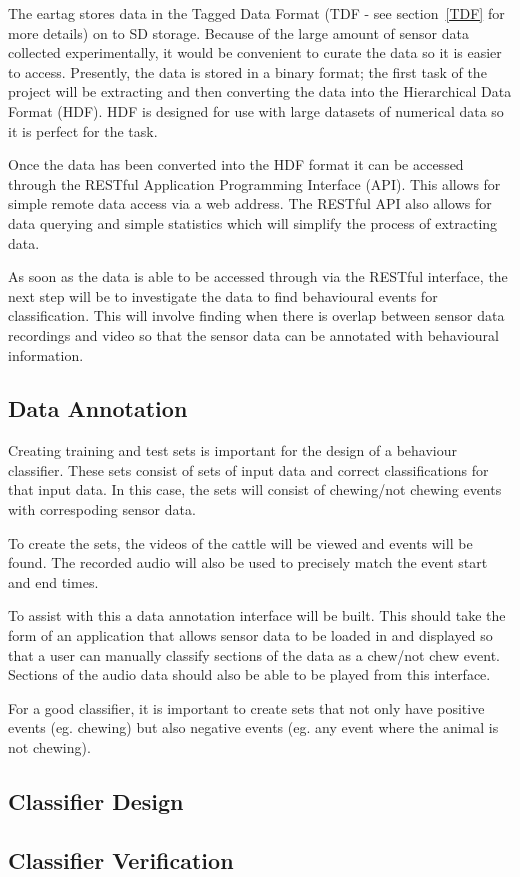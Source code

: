 The eartag stores data in the Tagged Data Format (TDF - see section~\ref{TDF} for more details) on to SD storage. Because of the large amount of sensor data collected experimentally, it would be convenient to curate the data so it is easier to access. Presently, the data is stored in a binary format; the first task of the project will be extracting and then converting the data into the Hierarchical Data Format (HDF). HDF is designed for use with large datasets of numerical data so it is perfect for the task.

Once the data has been converted into the HDF format it can be accessed through the RESTful Application Programming Interface (API). This allows for simple remote data access via a web address. The RESTful API also allows for data querying and simple statistics which will simplify the process of extracting data.

As soon as the data is able to be accessed through via the RESTful interface, the next step will be to investigate the data to find behavioural events for classification. This will involve finding when there is overlap between sensor data recordings and video so that the sensor data can be annotated with behavioural information.

\subsection*{Data Annotation}

Creating training and test sets is important for the design of a behaviour classifier. These sets consist of sets of input data and correct classifications for that input data. In this case, the sets will consist of chewing/not chewing events with correspoding sensor data. 

To create the sets, the videos of the cattle will be viewed and events will be found. The recorded audio will also be used to precisely match the event start and end times.  

To assist with this a data annotation interface  will be built. This should take the form of an application that allows sensor data to be loaded in and displayed so that a user can manually classify sections of the data as a chew/not chew event. Sections of the audio data should also be able to be played from this interface. 


For a good classifier, it is important to create sets that not only have positive events (eg. chewing) but also negative events (eg. any event where the animal is not chewing).

\subsection*{Classifier Design} 

\subsection*{Classifier Verification}


